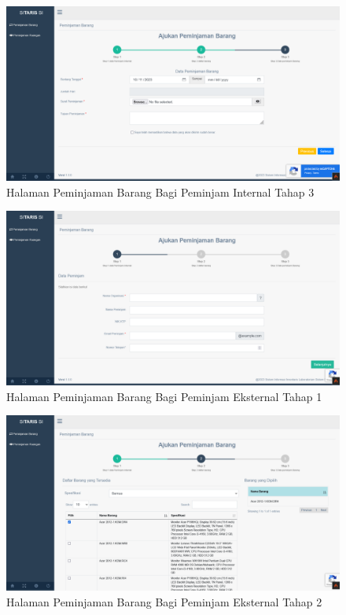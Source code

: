 \begin{enumerate}
        \begin{figure}
          \centering
          \includegraphics[width=0.82\linewidth]{konten//gambar/peminjaman barang tambah internal 3 hasil.png}
          \caption{Halaman Peminjaman Barang Bagi Peminjam Internal Tahap 3}
          \label{fig:enter-label}
        \end{figure}

        \begin{figure}
          \centering
          \includegraphics[width=0.82\linewidth]{konten//gambar/peminjaman barang tambah eksternal 1 hasil.png}
          \caption{Halaman Peminjaman Barang Bagi Peminjam Eksternal Tahap 1}
          \label{fig:enter-label}
        \end{figure}

        \begin{figure}
          \centering
          \includegraphics[width=0.82\linewidth]{konten//gambar/peminjaman barang tambah eksternal 2 hasil.png}
          \caption{Halaman Peminjaman Barang Bagi Peminjam Eksternal Tahap 2}
          \label{fig:enter-label}
        \end{figure}


\end{enumerate}

